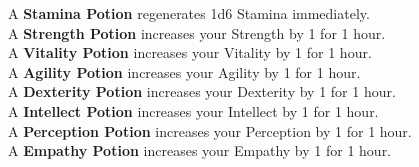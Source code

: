 A \textbf{Stamina Potion} regenerates 1d6 Stamina immediately.\\

A \textbf{Strength Potion} increases your Strength by 1 for 1 hour.\\

A \textbf{Vitality Potion} increases your Vitality by 1 for 1 hour.\\

A \textbf{Agility Potion} increases your Agility by 1 for 1 hour.\\

A \textbf{Dexterity Potion} increases your Dexterity by 1 for 1 hour.\\

A \textbf{Intellect Potion} increases your Intellect by 1 for 1 hour.\\

A \textbf{Perception Potion} increases your Perception by 1 for 1 hour.\\

A \textbf{Empathy Potion} increases your Empathy by 1 for 1 hour.\\